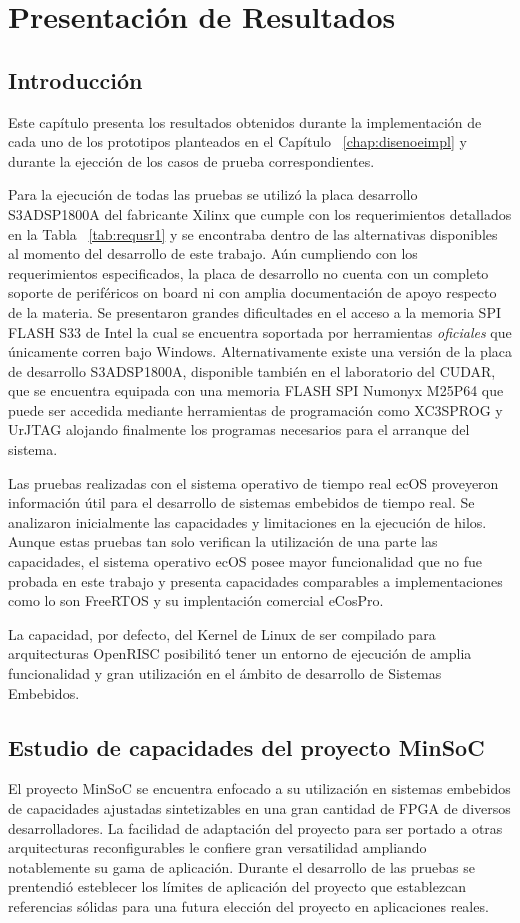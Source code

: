 \chapter{Presentación de Resultados}
	\section{Introducción} 
	
	Este capítulo presenta los resultados obtenidos durante la implementación de cada uno de los prototipos planteados en el Capítulo
	~\ref{chap:disenoeimpl} y durante la ejección de los casos de prueba correspondientes. 
	
	Para la ejecución de todas las pruebas se utilizó la placa desarrollo S3ADSP1800A del fabricante Xilinx que cumple con los requerimientos detallados
	en la Tabla ~\ref{tab:requsr1} y se encontraba dentro de las alternativas disponibles al momento del desarrollo de este trabajo. Aún cumpliendo con
	los requerimientos especificados, la placa de desarrollo no cuenta con un completo soporte de periféricos on board ni con amplia documentación de
	apoyo respecto de la materia. Se presentaron grandes dificultades en el acceso a la memoria SPI FLASH S33 de Intel la cual se encuentra soportada por
	herramientas \textit{oficiales} que únicamente corren bajo Windows. Alternativamente existe una versión de la placa de desarrollo S3ADSP1800A,
	disponible también en el laboratorio del CUDAR, que se encuentra equipada con una memoria FLASH SPI Numonyx M25P64 que puede ser accedida mediante
	herramientas de programación como XC3SPROG y UrJTAG alojando finalmente los programas necesarios para el arranque del sistema.
	
	Las pruebas realizadas con el sistema operativo de tiempo real ecOS proveyeron información útil para el desarrollo de sistemas embebidos de tiempo
	real. Se analizaron inicialmente las capacidades y limitaciones en la ejecución de hilos. Aunque estas pruebas tan solo verifican la utilización de
	una parte las capacidades, el sistema operativo ecOS posee mayor funcionalidad que no fue probada en este trabajo y presenta capacidades comparables
	a implementaciones como lo son FreeRTOS y su implentación comercial eCosPro.
	
	La capacidad, por defecto, del Kernel de Linux de ser compilado para arquitecturas OpenRISC posibilitó tener un entorno de ejecución de amplia
	funcionalidad y gran utilización en el ámbito de desarrollo de Sistemas Embebidos.  
	
	\section{Estudio de capacidades del proyecto MinSoC}
	El proyecto MinSoC se encuentra enfocado a su utilización en sistemas embebidos de capacidades ajustadas sintetizables en una gran cantidad de FPGA
	de diversos desarrolladores. La facilidad de adaptación del proyecto para ser portado a otras arquitecturas reconfigurables le confiere gran
	versatilidad ampliando notablemente su gama de aplicación.
	Durante el desarrollo de las pruebas se prentendió esteblecer los límites de aplicación del proyecto que establezcan referencias sólidas para una
	futura elección del proyecto en aplicaciones reales.

